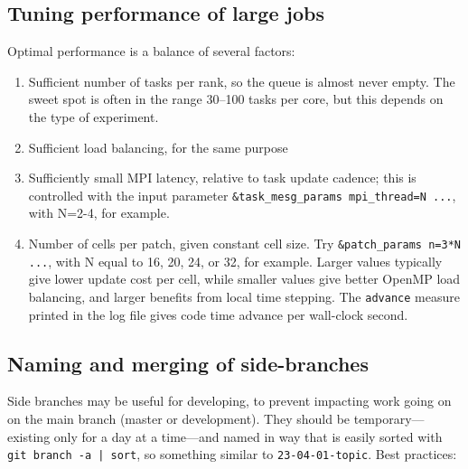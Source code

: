 \documentclass[paper=a4,fontsize=11pt]{scrartcl}
\numberwithin{equation}{section}		%
\numberwithin{figure}{section}			%
\numberwithin{table}{section}				%
\newcommand{\cmdcolor}{\color{ForestGreen}}
\newcommand{\Cmd}[1]{{\cmdcolor\texttt{#1}}}
\begin{document}
\subsection{Tuning performance of large jobs}
Optimal performance is a balance of several factors:
\begin{enumerate}
    \item Sufficient number of tasks per rank, so the queue is almost never empty.  The sweet spot is often in the range 30--100 tasks per core, but this depends on the type of experiment.
    \item Sufficient load balancing, for the same purpose
    \item Sufficiently small MPI latency, relative to task update cadence; this is controlled with the input parameter \verb|&task_mesg_params mpi_thread=N ...|, with N=2-4, for example.
    \item Number of cells per patch, given constant cell size.  Try \verb|&patch_params n=3*N ...|, with N equal to 16, 20, 24, or 32, for example.   Larger values typically give lower update cost per cell, while smaller values give better OpenMP load balancing, and larger benefits from local time stepping.  The \verb|advance| measure printed in the log file gives code time advance per wall-clock second.
\end{enumerate}

\subsection{Naming and merging of side-branches}
Side branches may be useful for developing, to prevent impacting work going on on the main branch (master or development). They should be temporary---existing only for a day at a time---and named in way that is easily sorted with \Cmd{git branch -a | sort}, so something similar to \Cmd{23-04-01-topic}.  Best practices:
\end{document}
